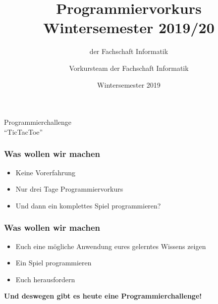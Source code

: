 
\usepackage{float}
\usepackage{listings}
\usepackage{graphicx}
\usepackage{epstopdf}
\usepackage{wrapfig}

\title[Programmiervorkurs]{Programmiervorkurs Wintersemester 2019/20}
\subtitle{{\small der Fachschaft Informatik}}
\author{Vorkursteam der Fachschaft Informatik}
\date{Wintersemester 2019}


	

\begin{frame}
	\begin{center}
		\vspace{2cm}
		{\huge Programmierchallenge \\ "`TicTacToe"'}
	\end{center}
\end{frame}


\begin{frame}
	\frametitle{Was wollen wir machen}
	\begin{itemize}
		\item Keine Vorerfahrung
		\item Nur drei Tage Programmiervorkurs
		\item Und dann ein komplettes Spiel programmieren?
	\end{itemize}
\end{frame}


\begin{frame}
	\frametitle{Was wollen wir machen}
	\begin{itemize}
		\item Euch eine mögliche Anwendung eures gelerntes Wissens zeigen
		\item Ein Spiel programmieren
		\item Euch herausfordern
	\end{itemize}
	\vspace{6mm}
	\begin{center}
		\textbf{\huge Und deswegen gibt es heute eine Programmierchallenge!}
	\end{center}

\end{frame}



